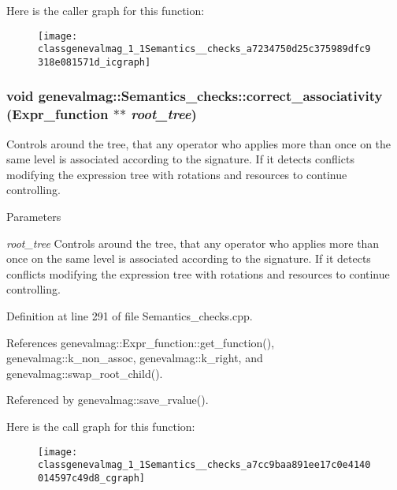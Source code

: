 Here is the caller graph for this function:\nopagebreak
\begin{figure}[H]
\begin{center}
\leavevmode
\texttt{[image: classgenevalmag\_1\_1Semantics\_\_checks\_a7234750d25c375989dfc9318e081571d\_icgraph]}
\end{center}
\end{figure}


\hypertarget{classgenevalmag_1_1Semantics__checks_a7cc9baa891ee17c0e4140014597c49d8}{
\subsubsection[{correct\_\-associativity}]{\setlength{\rightskip}{0pt plus 5cm}void genevalmag::Semantics\_\-checks::correct\_\-associativity ({\bf Expr\_\-function} $\ast$$\ast$ {\em root\_\-tree})}}
\label{classgenevalmag_1_1Semantics__checks_a7cc9baa891ee17c0e4140014597c49d8}
Controls around the tree, that any operator who applies more than once on the same level is associated according to the signature. If it detects conflicts modifying the expression tree with rotations and resources to continue controlling.


\begin{DoxyParams}{Parameters}
\item[{\em root\_\-tree}]Controls around the tree, that any operator who applies more than once on the same level is associated according to the signature. If it detects conflicts modifying the expression tree with rotations and resources to continue controlling. \end{DoxyParams}


Definition at line 291 of file Semantics\_\-checks.cpp.



References genevalmag::Expr\_\-function::get\_\-function(), genevalmag::k\_\-non\_\-assoc, genevalmag::k\_\-right, and genevalmag::swap\_\-root\_\-child().



Referenced by genevalmag::save\_\-rvalue().



Here is the call graph for this function:\nopagebreak
\begin{figure}[H]
\begin{center}
\leavevmode
\texttt{[image: classgenevalmag\_1\_1Semantics\_\_checks\_a7cc9baa891ee17c0e4140014597c49d8\_cgraph]}
\end{center}
\end{figure}




